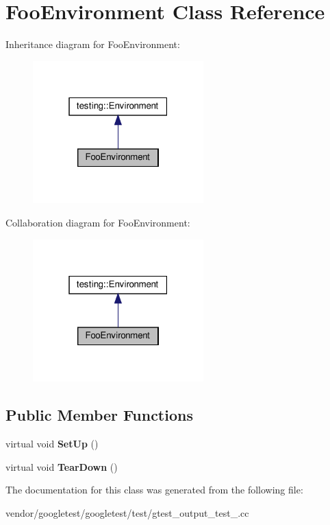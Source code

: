 \hypertarget{class_foo_environment}{}\section{Foo\+Environment Class Reference}
\label{class_foo_environment}


Inheritance diagram for Foo\+Environment\+:
\nopagebreak
\begin{figure}[H]
\begin{center}
\leavevmode
\includegraphics[width=187pt]{class_foo_environment__inherit__graph}
\end{center}
\end{figure}


Collaboration diagram for Foo\+Environment\+:
\nopagebreak
\begin{figure}[H]
\begin{center}
\leavevmode
\includegraphics[width=187pt]{class_foo_environment__coll__graph}
\end{center}
\end{figure}
\subsection*{Public Member Functions}
\begin{DoxyCompactItemize}
\item 
\mbox{\label{class_foo_environment_a7db8d8b312805aff437ae8534132a56d}} 
virtual void {\bfseries Set\+Up} ()
\item 
\mbox{\label{class_foo_environment_a99a2c9df52106cce9e7a4bdda53df802}} 
virtual void {\bfseries Tear\+Down} ()
\end{DoxyCompactItemize}


The documentation for this class was generated from the following file\+:\begin{DoxyCompactItemize}
\item 
vendor/googletest/googletest/test/gtest\+\_\+output\+\_\+test\+\_\+.\+cc\end{DoxyCompactItemize}

